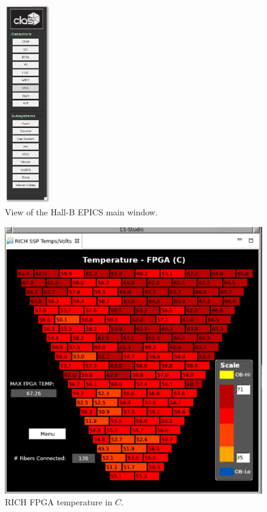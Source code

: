 \documentclass[12pt]{article}
\begin{document}
\begin{figure}[h!]
\center
\includegraphics[width=0.18\textwidth]{pics/CLAS_EPICS.pdf}
\caption{ \label{fig:RICH_EPICSmain} View of the Hall-B EPICS main window.}
\end{figure}




\begin{figure}[!htb]
     \centering
     \includegraphics[width=1.2\linewidth]{pics/RICH_temp.png}
     \caption{RICH FPGA temperature in $C$.}
     \label{fig:RICH_temp}
\end{figure}
\end{document}
